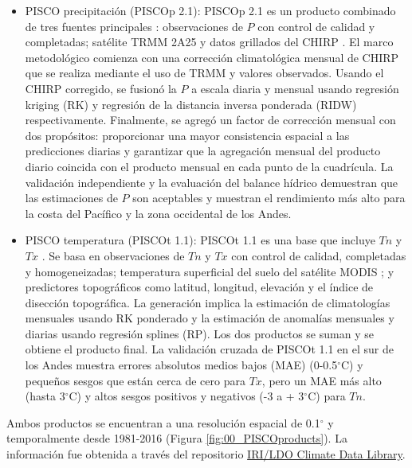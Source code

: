 \documentclass[12pt]{article}
\begin{document}
\begin{itemize}
	\item PISCO precipitación (PISCOp 2.1): PISCOp 2.1 es un producto combinado de tres fuentes principales \citep{Aybar2019}: observaciones de $P$ con control de calidad y completadas; satélite TRMM 2A25 \citep{iguchi2000rain} y datos grillados del CHIRP \citep{funk2015climate}. El marco metodológico comienza con una corrección climatológica mensual de CHIRP que se realiza mediante el uso de TRMM y valores observados. Usando el CHIRP corregido, se fusionó la $P$ a escala diaria y mensual usando regresión kriging (RK) y regresión de la distancia inversa ponderada (RIDW) respectivamente. Finalmente, se agregó un factor de corrección mensual con dos propósitos: proporcionar una mayor consistencia espacial a las predicciones diarias y garantizar que la agregación mensual del producto diario coincida con el producto mensual en cada punto de la cuadrícula. La validación independiente y la evaluación del balance hídrico demuestran que las estimaciones de $P$ son aceptables y muestran el rendimiento más alto para la costa del Pacífico y la zona occidental de los Andes.

\clearpage
	
	\item PISCO temperatura (PISCOt 1.1): PISCOt 1.1 es una base que incluye $Tn$ y $Tx$ \citep{Huerta2019}. Se basa en observaciones de $Tn$ y $Tx$ con control de calidad, completadas y homogeneizadas; temperatura superficial del suelo del satélite MODIS \citep{jin2010land}; y predictores topográficos como latitud, longitud, elevación y el índice de disección topográfica. La generación implica la estimación de climatologías mensuales usando RK ponderado y la estimación de anomalías mensuales y diarias usando regresión splines (RP). Los dos productos se suman y se obtiene el producto final. La validación cruzada de PISCOt 1.1 en el sur de los Andes muestra errores absolutos medios bajos (MAE) (0-0.5$^{\circ}$C) y pequeños sesgos que están cerca de cero para $Tx$, pero un MAE más alto (hasta 3$^{\circ}$C) y altos sesgos positivos y negativos (-3 a + 3$^{\circ}$C) para $Tn$.
	
\end{itemize}

Ambos productos se encuentran a una resolución espacial de 0.1$^{\circ}$ y temporalmente desde 1981-2016 (Figura \ref{fig:00_PISCOproducts}). La información fue obtenida a través del repositorio \href{http://iridl.ldeo.columbia.edu/SOURCES/.SENAMHI/.HSR/.PISCO/}{IRI/LDO Climate Data Library}.
\end{document}
